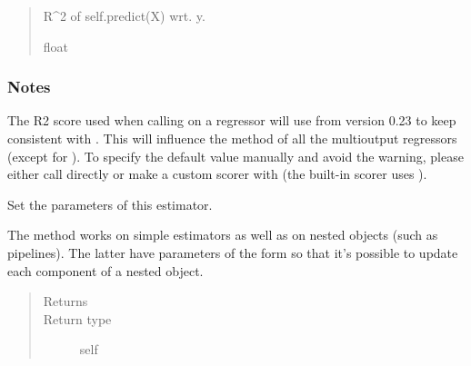 \documentclass[letterpaper,10pt,english]{sphinxmanual}
\begin{document}
{\begin{fulllineitems}
\begin{fulllineitems}
\begin{quote}
\begin{description}
\begin{itemize}
\end{itemize}

\item[{Returns}] \leavevmode
{} \textendash{} R\textasciicircum{}2 of self.predict(X) wrt. y.

\item[{Return type}] \leavevmode
float

\end{description}\end{quote}
\subsubsection*{Notes}

The R2 score used when calling  on a regressor will use
 from version 0.23 to keep consistent
with . This will influence the  method of
all the multioutput regressors (except for
). To specify the default value
manually and avoid the warning, please either call 
directly or make a custom scorer with  (the
built-in scorer  uses ).

\end{fulllineitems}


\begin{fulllineitems}
\label{\detokenize{api_reference:group_lasso.GroupLasso.set_params}}
Set the parameters of this estimator.

The method works on simple estimators as well as on nested objects
(such as pipelines). The latter have parameters of the form
 so that it’s possible to update each
component of a nested object.
\begin{quote}\begin{description}
\item[{Returns}] \leavevmode


\item[{Return type}] \leavevmode
self


\end{description}
\end{quote}
\end{fulllineitems}
\end{fulllineitems}}
\end{document}
